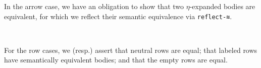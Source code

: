 \documentclass[authoryear, acmsmall, screen, review, nonacm]{acmart}
\begin{document}
In the arrow case, we have an obligation to show that two $\eta$-expanded bodies are equivalent, for which we reflect their semantic equivalence via \verb!reflect-≋!.

\begin{code}%
\>[0]\AgdaSpace{}%
\AgdaSymbol{\{}\AgdaSpace{}%
\AgdaSymbol{=}\AgdaSpace{}%
\AgdaSpace{}%
\AgdaSpace{}%
\AgdaSymbol{\}}\AgdaSpace{}%
\AgdaSymbol{\{}\AgdaSymbol{\}}\AgdaSpace{}%
\AgdaSymbol{\{}\AgdaSymbol{\}}\<%
\\
\>[0][@{}l@{\AgdaIndent{0}}]%
\>[2]\AgdaSymbol{(}\AgdaSpace{}%
\AgdaSpace{}%
\AgdaOperator{\AgdaInductiveConstructor{,}}\AgdaSpace{}%
\AgdaSymbol{(}\AgdaSpace{}%
\AgdaSpace{}%
\AgdaOperator{\AgdaInductiveConstructor{,}}\AgdaSpace{}%
\AgdaSpace{}%
\AgdaSymbol{)}\AgdaSpace{}%
\AgdaSymbol{)}\AgdaSpace{}%
\AgdaSymbol{=}\AgdaSpace{}%
\AgdaSpace{}%
\AgdaSpace{}%
\AgdaSymbol{(}%
\>[52]\AgdaSymbol{(}\AgdaSpace{}%
\AgdaSpace{}%
\AgdaSymbol{(}\AgdaSpace{}%
\AgdaSymbol{)))}\<%
\end{code}

For the row cases, we (resp.) assert that neutral rows are equal; that labeled rows have semantically equivalent bodies; and that the empty rows are equal.
\end{document}
